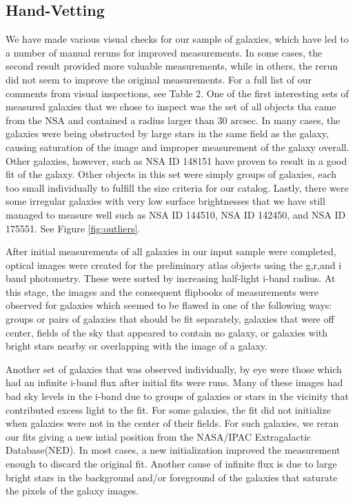 \documentclass[12pt,preprint,pdftex]{aastex}
\newcommand{\units}[1]{\mathrm{#1}}
\renewcommand{\arcsec}{\units{arcsec}}
\begin{document}
\subsection{Hand-Vetting}\label{sec:handvetting}
We have made various visual checks for our sample of galaxies, which
have led to a number of manual reruns for improved measurements. In
some cases, the second result provided more valuable measurements,
while in others, the rerun did not seem to improve the original
measurements. For a full list of our comments from visual inspections,
see Table 2. One of the first interesting sets of measured galaxies
that we chose to inspect was the set of all objects tha came from the
NSA and contained a radius larger than 30 $\arcsec$. In many cases,
the galaxies were being obstructed by large stars in the same field as
the galaxy, causing saturation of the image and improper measurement
of the galaxy overall. Other galaxies, however, such as NSA ID 148151
have proven to result in a good fit of the galaxy. Other objects in
this set were simply groups of galaxies, each too small individually
to fulfill the size criteria for our catalog. Lastly, there were some
irregular galaxies with very low surface brightnesses that we have
still managed to measure well such as NSA ID 144510, NSA ID 142450,
and NSA ID 175551. See Figure \ref{fig:outliers}.

After initial measurements of all galaxies in our input sample were
completed, optical images were created for the preliminary atlas
objects using the g,r,and i band photometry. These were sorted by
increasing half-light i-band radius. At this stage, the images and the
consequent flipbooks of measurements were observed for galaxies which
seemed to be flawed in one of the following ways: groups or pairs of
galaxies that should be fit separately, galaxies that were off
center, fields of the sky that appeared to contain no galaxy, or
galaxies with bright stars nearby or overlapping with the image of a
galaxy.

Another set of galaxies that was observed individually, by eye were
those which had an infinite i-band flux after initial fits
were runs. Many of these images had bad sky levels in the i-band due
to groups of galaxies or stars in the vicinity that contributed excess
light to the fit. For some galaxies, the fit did not initialize when
galaxies were not in the center of their fields. For such galaxies, we
reran our fits giving a new intial position from the NASA/IPAC
Extragalactic Database(NED). In most cases, a new
initialization improved the measurement enough to discard the original
fit. Another cause of infinite flux is due to large bright stars in
the background and/or foreground of the galaxies that saturate the
pixels of the galaxy images.
\end{document}
